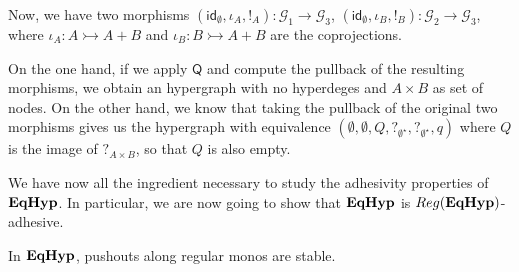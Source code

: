 \documentclass[a4paper,UKenglish,cleveref,pdftex,thm-restate,numberwithinsect]{lipics-v2021}
\newcommand{\quo}{\mathsf{Q}}
\newcommand{\catname}[1]{\textbf{\textup{#1}}}
\newcommand{\EqHyp}{\catname{EqHyp}} %
\newcommand{\reg}{\mathsf{Reg}}
\newcommand{\mto}{\rightarrowtail}
\newcommand{\id}[1]{\mathsf{id}_{#1}}
\begin{document}
{\begin{example}
Now, we have two morphisms $(\id{\emptyset}, \iota_A, !_A)\colon \mathcal{G}_1 \to \mathcal{G}_3$,  $(\id{\emptyset}, \iota_B, !_B)\colon  \mathcal{G}_2 \to \mathcal{G}_3$, where $\iota_A\colon A\mto A+B$  and $\iota_B\colon B \mto A+B$  are the coprojections.

On the one hand, if we apply $\quo$ and compute the pullback of the resulting morphisms, we obtain an hypergraph with no hyperdeges and $A\times B$ as set of nodes. On the other hand,  we know that taking the pullback of the original two morphisms gives us the hypergraph with equivalence $(\emptyset, \emptyset, Q, ?_{\emptyset^\star}, ?_{\emptyset^\star}, q)$ where $Q$ is the image of $?_{A\times B}$, so that $Q$ is also empty.  
\end{example}
}

We have now all the ingredient necessary to study the adhesivity properties of $\EqHyp$. In particular, we are now going to show that $\EqHyp$ is $\reg(\EqHyp)$-adhesive.

\begin{lemma}\label{lemma:stab}
	In $\EqHyp$, pushouts along regular monos are stable.
\end{lemma}
\end{document}
